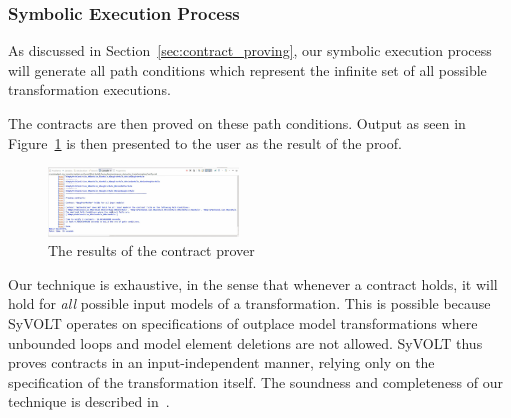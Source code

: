 


\subsubsection{Symbolic Execution Process}

As discussed in Section~\ref{sec:contract_proving}, our symbolic execution process will generate all path conditions which represent the infinite set of all possible transformation executions.

The contracts are then proved on these path conditions. Output as seen in Figure~\ref{fig:output} is then presented to the user as the result of the proof.


\begin{figure}
\centering
\includegraphics[width=0.45\textwidth]{figures/syvolt_prover/output}
\caption{The results of the contract prover}
\label{fig:output}
\end{figure}

Our technique is exhaustive, in the sense that whenever a contract holds, it
will hold for \emph{all} possible input models of a transformation. This is
possible because SyVOLT operates on specifications of outplace model transformations where unbounded loops and model element
deletions are not allowed. SyVOLT thus proves contracts in an input-independent
manner, relying only on the specification of the transformation itself. The
soundness and completeness of our technique is described in~\cite{Lucio2014}.


